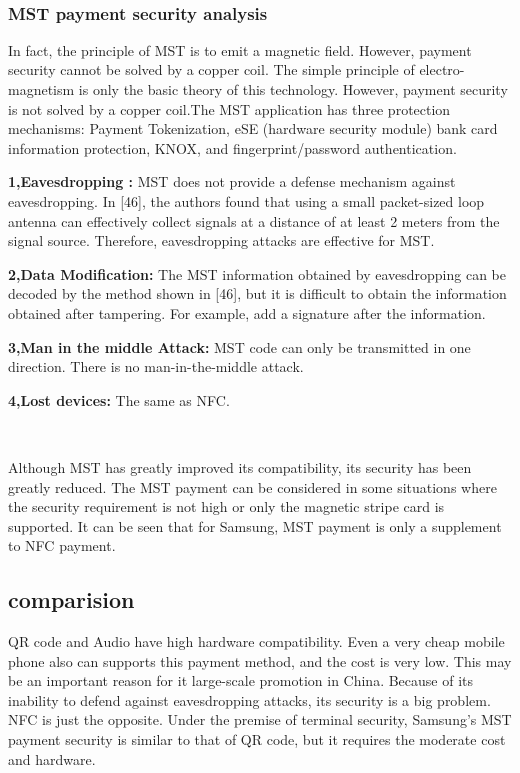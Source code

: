 \documentclass[journal]{IEEEtran}
\begin{document}
\

\subsubsection{MST payment security analysis}
In fact, the principle of MST is to emit a magnetic field. However, payment security cannot be solved by a copper coil. The simple principle of electro-magnetism is only the basic theory of this technology. However, payment security is not solved by a copper coil.The MST application has three protection mechanisms: Payment Tokenization, eSE (hardware security module) bank card information protection, KNOX, and fingerprint/password authentication.

\textbf{1,Eavesdropping :} MST does not provide a defense mechanism against eavesdropping. In [46], the authors found that using a small packet-sized loop antenna can effectively collect signals at a distance of at least 2 meters from the signal source. Therefore, eavesdropping attacks are effective for MST.

\textbf{2,Data Modification:}
The MST information obtained by eavesdropping can be decoded by the method shown in [46], but it is difficult to obtain the information obtained after tampering. For example, add a signature after the information.


\textbf{3,Man in the middle Attack:}
MST code can only be transmitted in one direction. There is no man-in-the-middle attack.

\textbf{4,Lost devices:}
The same as NFC. 

\


Although MST has greatly improved its compatibility, its security has been greatly reduced. The MST payment can be considered in some situations where the security requirement is not high or only the magnetic stripe card is supported. It can be seen that for Samsung, MST payment is only a supplement to NFC payment.

\subsection{comparision}
QR code and Audio have high hardware compatibility. Even a very cheap mobile phone also can supports this payment method, and the cost is very low. This may be an important reason for it large-scale promotion in China. Because of its inability to defend against eavesdropping attacks, its security is a big problem. NFC is just the opposite. Under the premise of terminal security, Samsung's MST payment security is similar to that of QR code, but it requires the moderate cost and hardware.
\end{document}
